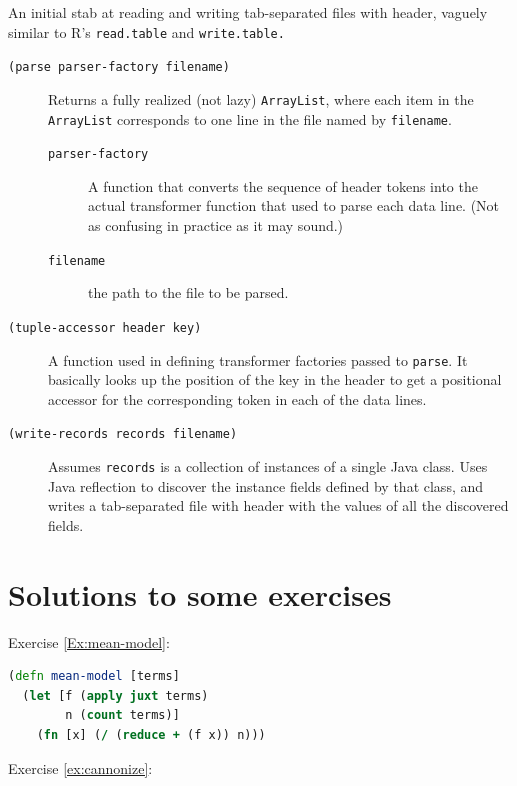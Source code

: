 \documentclass[10pt,openany]{article}
\numberwithin{definition}{section}
\numberwithin{example}{section}
\numberwithin{equation}{section}
\numberwithin{figure}{section}
\begin{document}
An initial stab at reading and writing tab-separated files with header,
vaguely similar to R's \texttt{read.table} and \texttt{write.table.}
\begin{description}
\item [{\texttt{(parse~parser-factory~filename)}}] Returns a fully realized
(not lazy) \texttt{ArrayList}, where each item in the \texttt{ArrayList}
corresponds to one line in the file named by \texttt{filename}.

\begin{description}
\item [{\texttt{parser-factory}}] A function that converts the sequence
of header tokens into the actual transformer function that used to
parse each data line. (Not as confusing in practice as it may sound.)
\item [{\texttt{filename}}] the path to the file to be parsed.
\end{description}
\item [{\texttt{(tuple-accessor~header~key)}}] A function used in defining
transformer factories passed to \texttt{parse}. It basically looks
up the position of the key in the header to get a positional accessor
for the corresponding token in each of the data lines.
\item [{\texttt{(write-records~records~filename)}}] Assumes \texttt{records}
is a collection of instances of a single Java class. Uses Java reflection
to discover the instance fields defined by that class, and writes
a tab-separated file with header with the values of all the discovered
fields.
\end{description}
\newpage{}


\section{Solutions to some exercises}

Exercise \ref{Ex:mean-model}:

\begin{minipage}[t]{1\columnwidth}%
\begin{lstlisting}[caption={Mean additive model},label={lis:mean-model},language=clojure,tabsize=2]
(defn mean-model [terms] 
  (let [f (apply juxt terms)
        n (count terms)]
    (fn [x] (/ (reduce + (f x)) n)))
\end{lstlisting}
%
\end{minipage}

Exercise \ref{ex:cannonize}:
\end{document}
